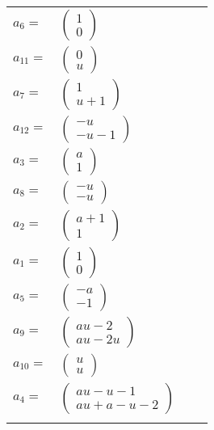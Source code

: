 \documentclass[1p]{elsarticle_modified}
\theoremstyle{definition}
\begin{document}
\begin{tabular}{m{7pt} m{180pt} m{7pt} m{180pt} }
\flushright $a_{6}=$&$\begin{pmatrix}1\\0\end{pmatrix}$ \\
\flushright $a_{11}=$&$\begin{pmatrix}0\\u\end{pmatrix}$ \\
\flushright $a_{7}=$&$\begin{pmatrix}1\\u+1\end{pmatrix}$ \\
\flushright $a_{12}=$&$\begin{pmatrix}- u\\- u-1\end{pmatrix}$ \\
\flushright $a_{3}=$&$\begin{pmatrix}a\\1\end{pmatrix}$ \\
\flushright $a_{8}=$&$\begin{pmatrix}- u\\- u\end{pmatrix}$ \\
\flushright $a_{2}=$&$\begin{pmatrix}a+1\\1\end{pmatrix}$ \\
\flushright $a_{1}=$&$\begin{pmatrix}1\\0\end{pmatrix}$ \\
\flushright $a_{5}=$&$\begin{pmatrix}- a\\-1\end{pmatrix}$ \\
\flushright $a_{9}=$&$\begin{pmatrix}a u-2\\a u-2 u\end{pmatrix}$ \\
\flushright $a_{10}=$&$\begin{pmatrix}u\\u\end{pmatrix}$ \\
\flushright $a_{4}=$&$\begin{pmatrix}a u- u-1\\a u+a- u-2\end{pmatrix}$\\&\end{tabular}
\end{document}
